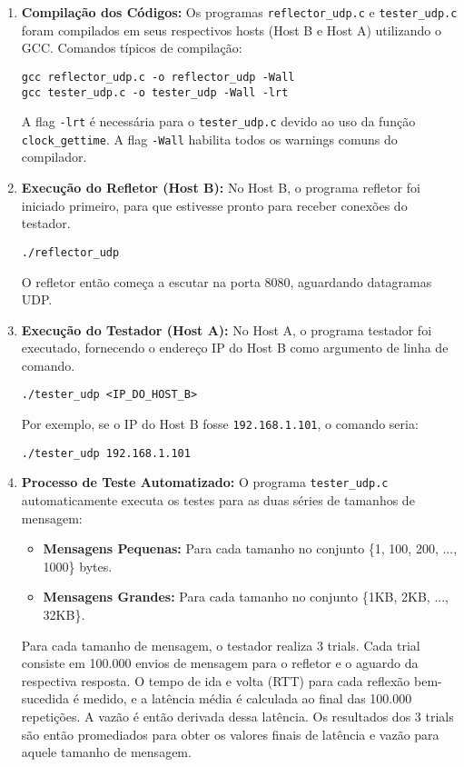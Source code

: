 \begin{enumerate}
    \item \textbf{Compilação dos Códigos:}
    Os programas \texttt{reflector\_udp.c} e \texttt{tester\_udp.c} foram compilados em seus respectivos hosts (Host B e Host A) utilizando o GCC. Comandos típicos de compilação:
    \begin{verbatim}
gcc reflector_udp.c -o reflector_udp -Wall
gcc tester_udp.c -o tester_udp -Wall -lrt 
    \end{verbatim}
    A flag \texttt{-lrt} é necessária para o \texttt{tester\_udp.c} devido ao uso da função \texttt{clock\_gettime}. A flag \texttt{-Wall} habilita todos os warnings comuns do compilador.

    \item \textbf{Execução do Refletor (Host B):}
    No Host B, o programa refletor foi iniciado primeiro, para que estivesse pronto para receber conexões do testador.
    \begin{verbatim}
./reflector_udp
    \end{verbatim}
    O refletor então começa a escutar na porta 8080, aguardando datagramas UDP.

    \item \textbf{Execução do Testador (Host A):}
    No Host A, o programa testador foi executado, fornecendo o endereço IP do Host B como argumento de linha de comando.
    \begin{verbatim}
./tester_udp <IP_DO_HOST_B>
    \end{verbatim}
    Por exemplo, se o IP do Host B fosse \texttt{192.168.1.101}, o comando seria:
    \begin{verbatim}
./tester_udp 192.168.1.101
    \end{verbatim}

    \item \textbf{Processo de Teste Automatizado:}
    O programa \texttt{tester\_udp.c} automaticamente executa os testes para as duas séries de tamanhos de mensagem:
    \begin{itemize}
        \item \textbf{Mensagens Pequenas:} Para cada tamanho no conjunto \{1, 100, 200, ..., 1000\} bytes.
        \item \textbf{Mensagens Grandes:} Para cada tamanho no conjunto \{1KB, 2KB, ..., 32KB\}.
    \end{itemize}
    Para cada tamanho de mensagem, o testador realiza 3 trials. Cada trial consiste em 100.000 envios de mensagem para o refletor e o aguardo da respectiva resposta. O tempo de ida e volta (RTT) para cada reflexão bem-sucedida é medido, e a latência média é calculada ao final das 100.000 repetições. A vazão é então derivada dessa latência. Os resultados dos 3 trials são então promediados para obter os valores finais de latência e vazão para aquele tamanho de mensagem.


\end{enumerate}
